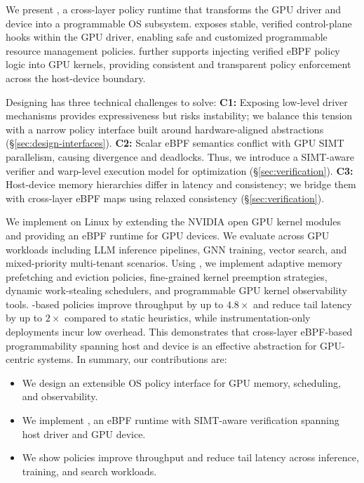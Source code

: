 We present \sys{}, a cross-layer policy runtime that transforms the GPU driver and device into a programmable OS subsystem. \sys{} exposes stable, verified control-plane hooks within the GPU driver, enabling safe and customized programmable resource management policies. 
\sys{} further supports injecting verified eBPF policy logic into GPU kernels, providing consistent and transparent policy enforcement across the host-device boundary.

Designing \sys{} has three technical challenges to solve: \textbf{C1:} Exposing low-level driver mechanisms provides expressiveness but risks instability; we balance this tension with a narrow policy interface built around hardware-aligned abstractions (\S\ref{sec:design-interfaces}). \textbf{C2:} Scalar eBPF semantics conflict with GPU SIMT parallelism, causing divergence and deadlocks. Thus, we introduce a SIMT-aware verifier and warp-level execution model for optimization (\S\ref{sec:verification}). \textbf{C3:} Host-device memory hierarchies differ in latency and consistency; we bridge them with cross-layer eBPF maps using relaxed consistency (\S\ref{sec:verification}).


We implement \sys{} on Linux by extending the NVIDIA open GPU kernel modules~\cite{nvidia-open-gpu} and providing an eBPF runtime for GPU devices. We evaluate \sys across GPU workloads including LLM inference pipelines, GNN training, vector search, and mixed-priority multi-tenant scenarios. Using \sys, we implement adaptive memory prefetching and eviction policies, fine-grained kernel preemption strategies, dynamic work-stealing schedulers, and programmable GPU kernel observability tools. \sys-based policies improve throughput by up to $4.8\times$ and reduce tail latency by up to $2\times$ compared to static heuristics, while instrumentation-only deployments incur low overhead. This demonstrates that cross-layer eBPF-based programmability spanning host and device is an effective abstraction for GPU-centric systems. In summary, our contributions are:

\begin{itemize}[leftmargin=*,itemsep=0pt]
  \item We design an extensible OS policy interface for GPU memory, scheduling, and observability.

  \item We implement \sys, an eBPF runtime with SIMT-aware verification spanning host driver and GPU device.

  \item We show \sys policies improve throughput and reduce tail latency across inference, training, and search workloads.
\end{itemize}
